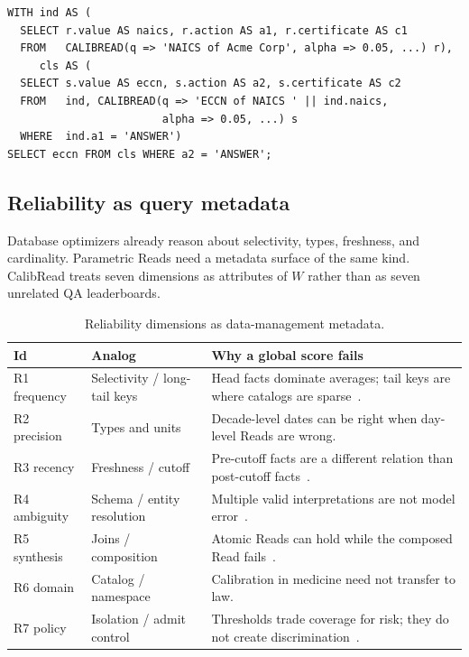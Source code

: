 \documentclass[sigconf, nonacm]{acmart}
\begin{document}
\begin{lstlisting}[caption={Composed parametric Reads. The plan fails closed if any hop abstains.},label={lst:compose}]
WITH ind AS (
  SELECT r.value AS naics, r.action AS a1, r.certificate AS c1
  FROM   CALIBREAD(q => 'NAICS of Acme Corp', alpha => 0.05, ...) r),
     cls AS (
  SELECT s.value AS eccn, s.action AS a2, s.certificate AS c2
  FROM   ind, CALIBREAD(q => 'ECCN of NAICS ' || ind.naics,
                        alpha => 0.05, ...) s
  WHERE  ind.a1 = 'ANSWER')
SELECT eccn FROM cls WHERE a2 = 'ANSWER';
\end{lstlisting}

\subsection{Reliability as query metadata}
\label{sec:surface}

Database optimizers already reason about selectivity, types, freshness, and cardinality. Parametric Reads need a metadata surface of the same kind. CalibRead treats seven dimensions as attributes of $W$ rather than as seven unrelated QA leaderboards.

\begin{table}[t]
\caption{Reliability dimensions as data-management metadata.}
\label{tab:dims}
\small
\begin{tabular}{@{}>{\raggedright\arraybackslash}p{}
                >{\raggedright\arraybackslash}p{}
                >{\raggedright\arraybackslash}p{}@{}}
\toprule
Id & Analog & Why a global score fails \\
\midrule
R1 frequency & Selectivity / long-tail keys & Head facts dominate averages; tail keys are where catalogs are sparse~\cite{kandpal2023large,mallen2023not}. \\
R2 precision & Types and units & Decade-level dates can be right when day-level Reads are wrong. \\
R3 recency & Freshness / cutoff & Pre-cutoff facts are a different relation than post-cutoff facts~\cite{zhang2021situatedqa,vu2024freshqa}. \\
R4 ambiguity & Schema / entity resolution & Multiple valid interpretations are not model error~\cite{min2020ambigqa}. \\
R5 synthesis & Joins / composition & Atomic Reads can hold while the composed Read fails~\cite{trivedi2022musique}. \\
R6 domain & Catalog / namespace & Calibration in medicine need not transfer to law. \\
R7 policy & Isolation / admit control & Thresholds trade coverage for risk; they do not create discrimination~\cite{geifman2019selectivenet,kamath2020selective}. \\
\bottomrule
\end{tabular}
\end{table}
\end{document}

